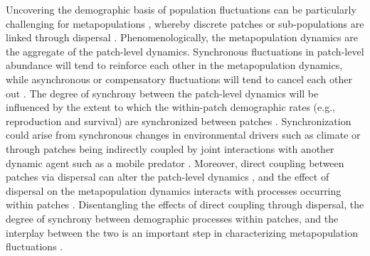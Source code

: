 \documentclass[11pt]{article}
\begin{document}
Uncovering the demographic basis of population fluctuations can be particularly challenging
for metapopulations
\citep{bjornstad2001}, 
whereby discrete patches or sub-populations are linked through dispersal
\citep{hanski1998}.
Phenomenologically, the metapopulation dynamics are the aggregate of the patch-level dynamics.
Synchronous fluctuations in patch-level abundance will tend to reinforce each other in the metapopulation dynamics,
while asynchronous or compensatory fluctuations will tend to cancel each other out
\citep{vasseur2007spectral}. 
The degree of synchrony between the patch-level dynamics will be influenced
by the extent to which the within-patch demographic rates 
(e.g., reproduction and survival) are synchronized between patches
\citep{ranta1995synchrony, liebhold2004spatial}.
Synchronization could arise from synchronous changes in environmental
drivers such as climate 
\citep{moran1953}
or through patches being indirectly coupled by joint interactions with another 
dynamic agent such as a mobile predator
\citep{ims2000, gilg2009}. 
Moreover, direct coupling between patches via dispersal can alter the patch-level dynamics
\citep{liebhold2004spatial},
and the effect of dispersal on the metapopulation dynamics interacts 
with processes occurring within patches 
\citep{ranta1995synchrony, kendall2000dispersal, goldwyn2008}.
Disentangling the effects of direct coupling through dispersal, 
the degree of synchrony between demographic processes within patches, 
and the interplay between the two 
is an important step in characterizing metapopulation fluctuations
\citep{liebhold2004spatial, abbott2011}.
\end{document}
